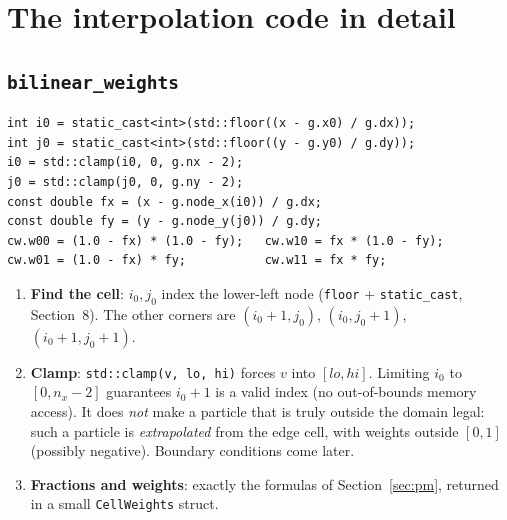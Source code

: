 \documentclass[11pt,a4paper]{article}
\begin{document}
\section{The interpolation code in detail}

\subsection{\texttt{bilinear\_weights}}
\begin{lstlisting}
int i0 = static_cast<int>(std::floor((x - g.x0) / g.dx));
int j0 = static_cast<int>(std::floor((y - g.y0) / g.dy));
i0 = std::clamp(i0, 0, g.nx - 2);
j0 = std::clamp(j0, 0, g.ny - 2);
const double fx = (x - g.node_x(i0)) / g.dx;
const double fy = (y - g.node_y(j0)) / g.dy;
cw.w00 = (1.0 - fx) * (1.0 - fy);   cw.w10 = fx * (1.0 - fy);
cw.w01 = (1.0 - fx) * fy;           cw.w11 = fx * fy;
\end{lstlisting}
\begin{enumerate}
  \item \textbf{Find the cell}: $i_0,j_0$ index the lower-left node (\texttt{floor} + \texttt{static\_cast},
        Section~8). The other corners are $(i_0+1,j_0)$, $(i_0,j_0+1)$, $(i_0+1,j_0+1)$.
  \item \textbf{Clamp}: \lstinline|std::clamp(v, lo, hi)| forces $v$ into $[lo,hi]$. Limiting $i_0$ to
        $[0,n_x-2]$ guarantees $i_0+1$ is a valid index (no out-of-bounds memory access). It does \emph{not}
        make a particle that is truly outside the domain legal: such a particle is \emph{extrapolated} from the
        edge cell, with weights outside $[0,1]$ (possibly negative). Boundary conditions come later.
  \item \textbf{Fractions and weights}: exactly the formulas of Section~\ref{sec:pm}, returned in a small
        \texttt{CellWeights} struct.
\end{enumerate}
\end{document}
